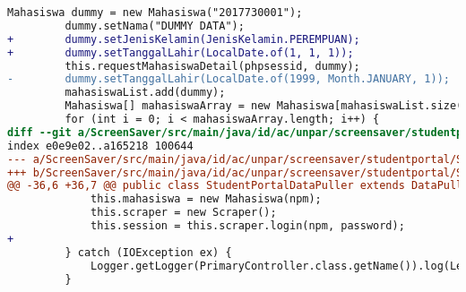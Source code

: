 \begin{lstlisting}[language=diff, caption=Perbedaan kode dosen dengan mahasiswa, label=diff_dosen_mahasiswa]
         Mahasiswa dummy = new Mahasiswa("2017730001");
         dummy.setNama("DUMMY DATA");
+        dummy.setJenisKelamin(JenisKelamin.PEREMPUAN);
+        dummy.setTanggalLahir(LocalDate.of(1, 1, 1));
         this.requestMahasiswaDetail(phpsessid, dummy);
-        dummy.setTanggalLahir(LocalDate.of(1999, Month.JANUARY, 1));
         mahasiswaList.add(dummy);
         Mahasiswa[] mahasiswaArray = new Mahasiswa[mahasiswaList.size()];
         for (int i = 0; i < mahasiswaArray.length; i++) {
diff --git a/ScreenSaver/src/main/java/id/ac/unpar/screensaver/studentportal/StudentPortalDataPuller.java b/ScreenSaver/src/main/java/id/ac/unpar/screensaver/studentportal/StudentPortalDataPuller.java
index e0e9e02..a165218 100644
--- a/ScreenSaver/src/main/java/id/ac/unpar/screensaver/studentportal/StudentPortalDataPuller.java
+++ b/ScreenSaver/src/main/java/id/ac/unpar/screensaver/studentportal/StudentPortalDataPuller.java
@@ -36,6 +36,7 @@ public class StudentPortalDataPuller extends DataPuller {
             this.mahasiswa = new Mahasiswa(npm);
             this.scraper = new Scraper();
             this.session = this.scraper.login(npm, password);
+
         } catch (IOException ex) {
             Logger.getLogger(PrimaryController.class.getName()).log(Level.SEVERE, null, ex);
         }
\end{lstlisting}